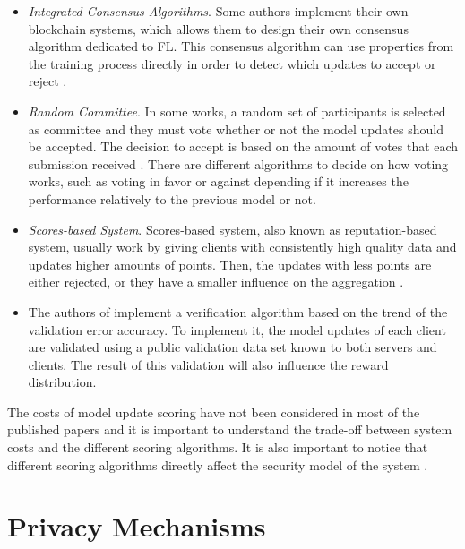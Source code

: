 \begin{itemize}
    \item \textit{Integrated Consensus Algorithms}. Some authors implement their own blockchain systems, which allows them to design their own consensus algorithm dedicated to FL. This consensus algorithm can use properties from the training process directly in order to detect which updates to accept or reject \cite{9293091, 10.1007/978-981-15-9213-3_12}.
    
    \item \textit{Random Committee}. In some works, a random set of participants is selected as committee and they must vote whether or not the model updates should be accepted. The decision to accept is based on the amount of votes that each submission received \cite{9159643}. There are different algorithms to decide on how voting works, such as voting in favor or against depending if it increases the performance relatively to the previous model or not.
    
    \item \textit{Scores-based System}. Scores-based system, also known as reputation-based system, usually work by giving clients with consistently high quality data and updates higher amounts of points. Then, the updates with less points are either rejected, or they have a smaller influence on the aggregation  \cite{10.48550/arxiv.2011.07516, 9170559, Peyvandi2022, 9292450}.
    
    \item The authors of \cite{8945913} implement a verification algorithm based on the trend of the validation error accuracy. To implement it, the model updates of each client are validated using a public validation data set known to both servers and clients. The result of this validation will also influence the reward distribution.

\end{itemize}

The costs of model update scoring have not been considered in most of the published papers and it is important to understand the trade-off between system costs and the different scoring algorithms\cite{9403374, 10.48550/arxiv.2110.02182}. It is also important to notice that different scoring algorithms directly affect the security model of the system \cite{10.48550/arxiv.2110.02182}.

\section{Privacy Mechanisms}\label{related_work:privacy}

